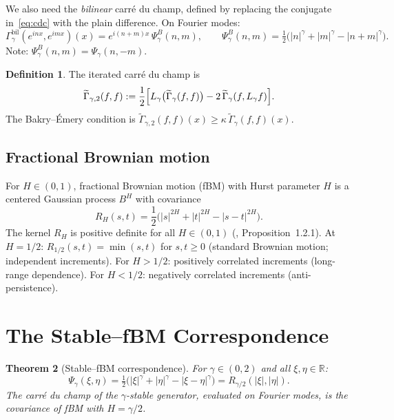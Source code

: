 \documentclass[11pt,a4paper]{article}
\theoremstyle{plain}
\newtheorem{theorem}{Theorem}[section]
\theoremstyle{definition}
\newtheorem{definition}[theorem]{Definition}
\theoremstyle{remark}
\newcommand{\R}{\mathbb{R}}
\begin{document}
We also need the \emph{bilinear} carr\'e du champ, defined by replacing
the conjugate in~\eqref{eq:cdc} with the plain difference. On Fourier modes:
\begin{equation}\label{eq:psi-bilinear}
  \Gamma_\gamma^{\mathrm{bil}}(e^{inx}, e^{imx})(x)
  = e^{i(n+m)x}\,\Psi_\gamma^B(n,m),
  \qquad
  \Psi_\gamma^B(n,m) = \tfrac{1}{2}\bigl(|n|^\gamma + |m|^\gamma
  - |n+m|^\gamma\bigr).
\end{equation}
Note: $\Psi_\gamma^B(n,m) = \Psi_\gamma(n,-m)$.

\begin{definition}\label{def:gamma2}
The iterated carr\'e du champ is
\begin{equation}\label{eq:gamma2-def}
  \widetilde{\Gamma}_{\gamma,2}(f,f)
  := \frac{1}{2}\Bigl[
    L_\gamma\bigl(\widetilde{\Gamma}_\gamma(f,f)\bigr)
    - 2\,\widetilde{\Gamma}_\gamma(f, L_\gamma f)
  \Bigr].
\end{equation}
The Bakry--\'Emery condition is
$\widetilde{\Gamma}_{\gamma,2}(f,f)(x) \geq \kappa\,
\widetilde{\Gamma}_\gamma(f,f)(x)$.
\end{definition}


\subsection{Fractional Brownian motion}

For $H \in (0,1)$, fractional Brownian motion (fBM) with Hurst
parameter $H$ is a centered Gaussian process $B^H$ with covariance
\begin{equation}\label{eq:fbm-cov}
  R_H(s,t)
  = \frac{1}{2}\bigl(|s|^{2H} + |t|^{2H} - |s-t|^{2H}\bigr).
\end{equation}
The kernel $R_H$ is positive definite for all $H \in (0,1)$
(\cite{Mishura2008}, Proposition~1.2.1).
At $H = 1/2$: $R_{1/2}(s,t) = \min(s,t)$ for $s,t \geq 0$
(standard Brownian motion; independent increments).
For $H > 1/2$: positively correlated increments (long-range dependence).
For $H < 1/2$: negatively correlated increments (anti-persistence).


\section{The Stable--fBM Correspondence}\label{sec:duality}

\begin{theorem}[Stable--fBM correspondence]\label{thm:duality}
For $\gamma \in (0,2)$ and all $\xi, \eta \in \R$:
\begin{equation}\label{eq:duality}
  \Psi_\gamma(\xi,\eta)
  = \tfrac{1}{2}\bigl(|\xi|^\gamma + |\eta|^\gamma
  - |\xi - \eta|^\gamma\bigr)
  = R_{\gamma/2}(|\xi|, |\eta|).
\end{equation}
The carr\'e du champ of the $\gamma$-stable generator, evaluated
on Fourier modes, is the covariance of fBM with $H = \gamma/2$.
\end{theorem}
\end{document}
